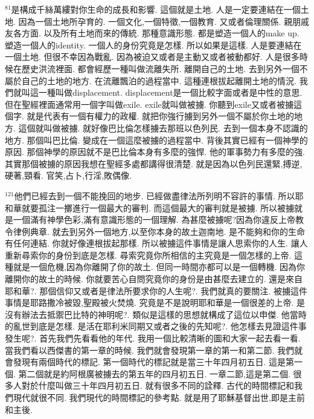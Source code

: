 \documentclass{book}
\begin{document}
$^{81}$是構成千絲萬縷對你生命的成長和影響.
這個就是土地.
人是一定要連結在一個土地.
因為一個土地所孕育的.
一個文化,一個特徵,一個教育.
又或者倫理關係.
親朋戚友各方面.
以及所有土地而來的傳統.
那種意識形態.
都是塑造一個人的make up.
塑造一個人的identity.
一個人的身份究竟是怎樣.
所以如果是這樣.
人是要連結在一個土地.
但很不幸因為戰亂.
因為被迫又或者是主動又或者被動都好.
人是很多時候在歷史洪流裡面.
都會經歷一種叫做流離失所.
離開自己的土地.
去到另外一個不屬於自己的土地的地方.
在流離飄泊的過程當中.
這種連根拔起離開土地的情況.
我們就叫這一種叫做displacement.
displacement是一個比較字面或者是中性的意思.
但在聖經裡面通常用一個字叫做exile.
exile就叫做被擄.
你聽到exile又或者被擄這個字.
就是代表有一個有權力的政權.
就把你強行擄到另外一個不屬於你土地的地方.
這個就叫做被擄.
就好像巴比倫怎樣擄去那班以色列民.
去到一個本身不認識的地方.
那個叫巴比倫.
變成在一個這麼被擄的過程當中.
背後其實已經有一個神學的原因.
那個神學的原因就不是巴比倫本身有多麼的強悍.
他的軍事勢力有多麼的強.
其實那個被擄的原因我想在聖經多處都講得很清楚.
就是因為以色列民還緊,搏逆,硬著,頸看.
官笑,占卜,行淫,敗偶像.

$^{121}$他們已經去到一個不能挽回的地步.
已經做盡律法所列明不容許的事情.
所以耶和華就要孤注一擲進行一個最大的審判.
而這個最大的審判就是被擄.
所以被擄就是一個滿有神學色彩,滿有意識形態的一個理解.
為甚麼被擄呢?因為你違反上帝教令律例典章.
就去到另外一個地方,以至你本身的故土迦南地.
是不能夠和你的生命有任何連結.
你就好像連根拔起那樣.
所以被擄這件事情是讓人思索你的人生.
讓人重新尋索你的身份到底是怎樣.
尋索究竟你所相信的主究竟是一個怎樣的上帝.
這種就是一個危機,因為你離開了你的故土.
但同一時間亦都可以是一個轉機.
因為你離開你的故土的時候.
你就要苦心自問究竟你的身份是由甚麼去建立的.
還是來自耶和華?.
那個信仰又或者是律法所要求你的人生呢?.
我們就真的要關注.
被擄這件事情是耶路撒冷被毀,聖殿被火焚燒.
究竟是不是說明耶和華是一個很差的上帝.
是沒有辦法去抵禦巴比特的神明呢?.
類似是這樣的思想就構成了這位以申傑.
他當時的亂世到底是怎樣.
是活在耶利米同期又或者之後的先知呢?.
他怎樣去見證這件事發生呢?.
首先我們先看看他的年代.
我用一個比較清晰的圖和大家一起去看一看.
當我們看以西傑書的第一章的時候.
我們就會發現第一章的第一和第二節.
我們就會發現有兩個時代的標記.
第一個時代的標記就是當三十年四月初五日.
這是第一個.
第二個就是約阿根廣被擄去的第五年的四月初五日.
一章二節,這是第二個.
很多人對於什麼叫做三十年四月初五日.
就有很多不同的詮釋.
古代的時間標記和我們現代就很不同.
我們現代的時間標記的參考點.
就是用了耶穌基督出世,即是主前和主後.
\end{document}
